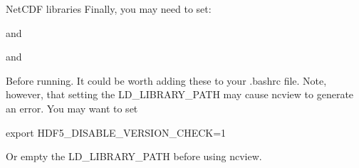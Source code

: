 \documentclass{beamer}
\newenvironment{Shaded}{}{}
\newcommand{\StringTok}[1]{\textcolor[rgb]{0.31,0.60,0.02}{{#1}}}
\newcommand{\VariableTok}[1]{\textcolor[rgb]{0.00,0.00,0.00}{{#1}}}
\newcommand{\BuiltInTok}[1]{{#1}}
\newcommand{\NormalTok}[1]{{#1}}
\begin{document}
\begin{frame}[fragile]{NetCDF libraries}
Finally, you may need to set:

\begin{Shaded}
\end{Shaded}

and

\begin{Shaded}
\end{Shaded}

and

\begin{Shaded}
\end{Shaded}

Before running. It could be worth adding these to your .bashrc file.
Note, however, that setting the LD\_LIBRARY\_PATH may cause ncview to
generate an error. You may want to set

\begin{Shaded}
\begin{Highlighting}[]
\BuiltInTok{export} \VariableTok{HDF5_DISABLE_VERSION_CHECK=}\NormalTok{1}
\end{Highlighting}
\end{Shaded}

Or empty the LD\_LIBRARY\_PATH before using ncview.

\end{frame}

\end{document}
